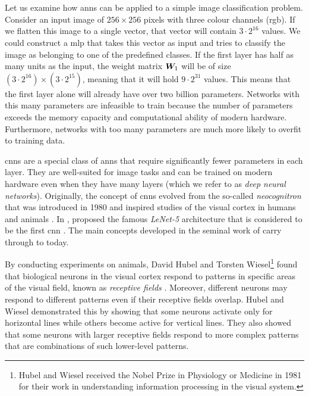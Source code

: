 \documentclass[../report.tex]{subfiles}
\begin{document}
\section{}
\label{sec:cnns}
Let us examine how \glspl{ann} can be applied to a simple image classification problem.
Consider an input image of $256 \times 256$ pixels with three colour channels (\gls{rgb}).
If we flatten this image to a single vector, that vector will contain $3 \cdot 2^{16}$ values.
We could construct a \gls{mlp} that takes this vector as input and tries to classify the image as belonging to one of the predefined classes.
If the first layer has half as many units as the input, the weight matrix ${\bm{W}}_1$ will be of size $(3 \cdot 2^{16}) \times (3 \cdot 2^{15})$, meaning that it will hold $9 \cdot 2^{31}$ values.
This means that the first layer alone will already have over two billion parameters.
Networks with this many parameters are infeasible to train because the number of parameters exceeds the memory capacity and computational ability of modern hardware.
Furthermore, networks with too many parameters are much more likely to overfit to training data.

\Glspl{cnn} are a special class of \glspl{ann} that require significantly fewer parameters in each layer.
They are well-suited for image tasks and can be trained on modern hardware even when they have many layers (which we refer to as \emph{deep neural networks}).
Originally, the concept of \glspl{cnn} evolved from the so-called \emph{neocognitron} that was introduced in 1980 and inspired studies of the visual cortex in humans and animals \cite{fukushima1980}.
In \citeyear{lecun1998}, \citeauthor{lecun1998} proposed the famous \emph{LeNet-5} architecture that is considered to be the first \gls{cnn} \cite{lecun1998}. 
The main concepts developed in the seminal work of \citeauthor{lecun1998} carry through to today.

By conducting experiments on animals, David Hubel and Torsten Wiesel\footnote{Hubel and Wiesel received the Nobel Prize in Physiology or Medicine in 1981 for their work in understanding information processing in the visual system.} found that biological neurons in the visual cortex respond to patterns in specific areas of the visual field, known as \emph{receptive fields} \cite{hubel1959}.
Moreover, different neurons may respond to different patterns even if their receptive fields overlap.
Hubel and Wiesel demonstrated this by showing that some neurons activate only for horizontal lines while others become active for vertical lines.
They also showed that some neurons with larger receptive fields respond to more complex patterns that are combinations of such lower-level patterns.
\end{document}
